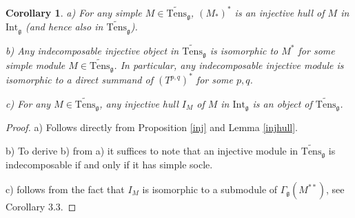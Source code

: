 \documentclass{birkmult}
\newcounter{theorem}
\newtheorem{corollary}[theo]{Corollary}
\renewcommand{\gg}{\mathfrak{g}}
\newcommand{\refprop}[1]{Proposition \ref{#1}}
\newcommand{\Int}{\mathrm{Int}}
\newcommand{\lind}{\widetilde{\mathrm{Tens}}}
\begin{document}
\begin{corollary}\label{injtenscat}
a) For any simple $M\in\lind_\gg$, $(M_*)^*$ is an injective
hull of $M$ in $\Int_\gg$ (and hence also in $\lind_\gg$).

b) Any indecomposable injective object in $\lind_\gg$ is
isomorphic to $M^*$ for some simple module $M\in\lind_\gg$. In
particular, any indecomposable injective module is isomorphic to a
direct summand of $(T^{p,q})^*$ for some $p,q$.

c) For any $M\in\lind_\gg$, any injective hull $I_M$ of $M$ in $\Int_\gg$
is an object of $\lind_\gg$.
\end{corollary}
\begin{proof} a) Follows directly from \refprop{inj} and Lemma \ref{injhull}.

b) To derive b) from a) it suffices to note that an injective module in
$\lind_\gg$ is indecomposable if and only if it has simple socle.

c) follows from the fact that $I_M$ is isomorphic to a submodule of
$\Gamma_\gg(M^{**})$, see Corollary 3.3.
\end{proof}
\end{document}
